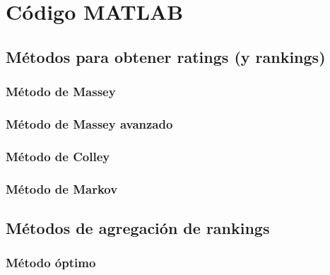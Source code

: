 \chapter{Código MATLAB}

\section{Métodos para obtener ratings (y rankings)}

\subsection*{Método de Massey}



\subsection*{Método de Massey avanzado}

\subsection*{Método de Colley}

\subsection*{Método de Markov}

\section{Métodos de agregación de rankings}

\subsection*{Método óptimo}

